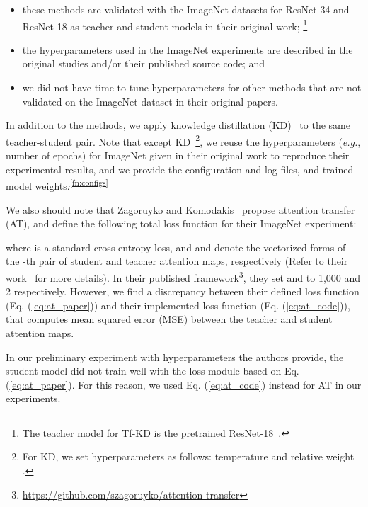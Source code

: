 \documentclass[runningheads]{llncs}
\begin{document}
\begin{itemize}
    \setlength\itemsep{0em}
    \item these methods are validated with the ImageNet datasets for ResNet-34 and ResNet-18 as teacher and student models in their original work; \footnote{The teacher model for Tf-KD is the pretrained ResNet-18~\cite{yuan2020revisiting}.}
    \item the hyperparameters used in the ImageNet experiments are described in the original studies and/or their published source code; and
    \item we did not have time to tune hyperparameters for other methods that are not validated on the ImageNet dataset in their original papers.
\end{itemize}

In addition to the methods, we apply knowledge distillation (KD)~\cite{hinton14distilling} to the same teacher-student pair.
Note that except KD~\footnote{For KD, we set hyperparameters as follows: temperature  and relative weight .}, we reuse the hyperparameters (\emph{e.g.}, number of epochs) for ImageNet given in their original work to reproduce their experimental results, and we provide the configuration and log files, and trained model weights.\textsuperscript{\ref{fn:configs}}


We also should note that Zagoruyko and Komodakis~\cite{zagoruyko2017paying} propose attention transfer (AT), and define the following total loss function for their ImageNet experiment:



\noindent where  is a standard cross entropy loss, and  and  denote the vectorized forms of the -th pair of student and teacher attention maps, respectively (Refer to their work~\cite{zagoruyko2017paying} for more details).
In their published framework\footnote{\url{https://github.com/szagoruyko/attention-transfer}}, they set  and  to 1,000 and 2 respectively.
However, we find a discrepancy between their defined loss function (Eq. (\ref{eq:at_paper})) and their implemented loss function (Eq. (\ref{eq:at_code})), that computes mean squared error (MSE) between the teacher and student attention maps.



In our preliminary experiment with hyperparameters the authors provide, the student model did not train well with the loss module based on Eq. (\ref{eq:at_paper}).
For this reason, we used Eq. (\ref{eq:at_code}) instead for AT in our experiments.
\end{document}
